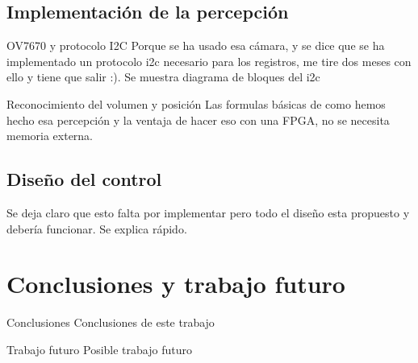 \documentclass{beamer}
\begin{document}
\subsection{Implementación de la percepción}
\begin{frame}{OV7670 y protocolo I2C}
Porque se ha usado esa cámara, y se dice que se ha implementado un protocolo i2c necesario para los registros, me tire dos meses con ello y tiene que salir :). Se muestra diagrama de bloques del i2c
\end{frame}
\begin{frame}{Reconocimiento del volumen y posición}
Las formulas básicas de como hemos hecho esa percepción y la ventaja de hacer eso con una FPGA, no se necesita memoria externa. 
\end{frame}
\subsection{Diseño del control}
\begin{frame}
Se deja claro que esto falta por implementar pero todo el diseño esta propuesto y debería funcionar. Se explica rápido.
\end{frame}
\section{Conclusiones y trabajo futuro}
\begin{frame}{Conclusiones}
Conclusiones de este trabajo
\end{frame}
\begin{frame}{Trabajo futuro}
Posible trabajo futuro
\end{frame}
\end{document}
